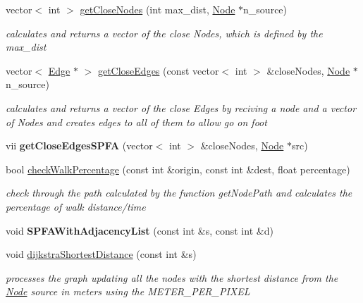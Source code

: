 \begin{DoxyCompactItemize}
vector$<$ int $>$ \hyperlink{class_graph_aafb88743e904e0bd0021552d6e04aa78}{get\+Close\+Nodes} (int max\+\_\+dist, \hyperlink{class_node}{Node} $\ast$n\+\_\+source)
\begin{DoxyCompactList}\small\item\em calculates and returns a vector of the close Nodes, which is defined by the max\+\_\+dist \end{DoxyCompactList}\item 
vector$<$ \hyperlink{class_edge}{Edge} $\ast$ $>$ \hyperlink{class_graph_aae706b755ac7ac2c155ac06dc52f25be}{get\+Close\+Edges} (const vector$<$ int $>$ \&close\+Nodes, \hyperlink{class_node}{Node} $\ast$n\+\_\+source)
\begin{DoxyCompactList}\small\item\em calculates and returns a vector of the close Edges by reciving a node and a vector of Nodes and creates edges to all of them to allow go on foot \end{DoxyCompactList}\item 
\mbox{\label{class_graph_a327ba698833edb0e854bd875d9be1ffc}} 
vii {\bfseries get\+Close\+Edges\+S\+P\+FA} (vector$<$ int $>$ \&close\+Nodes, \hyperlink{class_node}{Node} $\ast$src)
\item 
bool \hyperlink{class_graph_aa8ec47961beb1b619d1d72e8205ebb63}{check\+Walk\+Percentage} (const int \&origin, const int \&dest, float percentage)
\begin{DoxyCompactList}\small\item\em check through the path calculated by the function get\+Node\+Path and calculates the percentage of walk distance/time \end{DoxyCompactList}\item 
\mbox{\label{class_graph_a9139bc65d5edb348d7e283e4468e5a3e}} 
void {\bfseries S\+P\+F\+A\+With\+Adjacency\+List} (const int \&s, const int \&d)
\item 
void \hyperlink{class_graph_ab8c22a8531c0fccd1e7e555ece7b388d}{dijkstra\+Shortest\+Distance} (const int \&s)
\begin{DoxyCompactList}\small\item\em processes the graph updating all the nodes with the shortest distance from the \hyperlink{class_node}{Node} source in meters using the M\+E\+T\+E\+R\+\_\+\+P\+E\+R\+\_\+\+P\+I\+X\+EL \end{DoxyCompactList}\item 

\end{DoxyCompactItemize}
